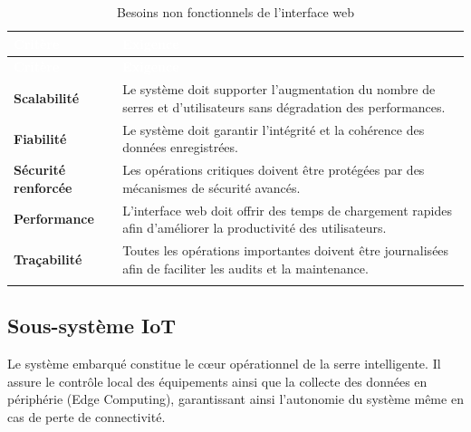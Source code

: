 {\small
	\renewcommand{\arraystretch}{1.5}
	\begin{longtable}{|p{4cm}|p{9cm}|}
		
		\hline
		\rowcolor[HTML]{2C3E50}
		\textcolor{white}{\textbf{Critère}} &
		\textcolor{white}{\textbf{Exigence}}
		\\ \hline
		\endfirsthead
		
		\hline
		\rowcolor[HTML]{2C3E50}
		\textcolor{white}{\textbf{Critère}} &
		\textcolor{white}{\textbf{Exigence}}
		\\ \hline
		\endhead
		
		\rowcolor[HTML]{EFEFEF}
		\textbf{Scalabilité} &
		Le système doit supporter l’augmentation du nombre de serres et d’utilisateurs sans dégradation des performances.
		\\ \hline
		
		\textbf{Fiabilité} &
		Le système doit garantir l’intégrité et la cohérence des données enregistrées.
		\\ \hline
		
		\rowcolor[HTML]{EFEFEF}
		\textbf{Sécurité renforcée} &
		Les opérations critiques doivent être protégées par des mécanismes de sécurité avancés.
		\\ \hline
		
		\textbf{Performance} &
		L’interface web doit offrir des temps de chargement rapides afin d’améliorer la productivité des utilisateurs.
		\\ \hline
		
		\rowcolor[HTML]{EFEFEF}
		\textbf{Traçabilité} &
		Toutes les opérations importantes doivent être journalisées afin de faciliter les audits et la maintenance.
		\\ \hline
		
		\caption{Besoins non fonctionnels de l’interface web}
		\label{tab:bnf-web}
		
	\end{longtable}
}
\subsection{Sous-système IoT}

Le système embarqué constitue le cœur opérationnel de la serre intelligente. Il assure le contrôle local des équipements ainsi que la collecte des données en périphérie (Edge Computing), garantissant ainsi l’autonomie du système même en cas de perte de connectivité.

